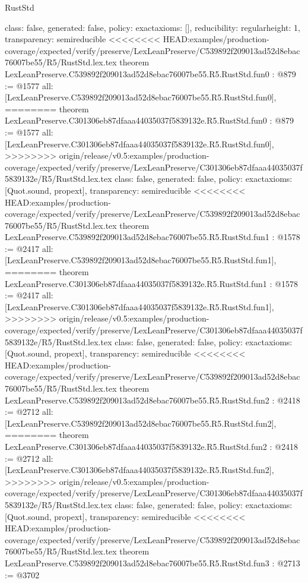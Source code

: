 \begin{lexlean}{RustStd}
\begin{coremodule}
{\begin{coremodule}
{{{  class: false,
  generated: false,
  policy: exact{axioms: []},
  reducibility: regular{height: 1},
  transparency: semireducible
}
<<<<<<<< HEAD:examples/production-coverage/expected/verify/preserve/LexLeanPreserve/C539892f209013ad52d8ebac76007be55/R5/RustStd.lex.tex
theorem LexLeanPreserve.C539892f209013ad52d8ebac76007be55.R5.RustStd.fun0 : @879 := @1577 {
  all: [LexLeanPreserve.C539892f209013ad52d8ebac76007be55.R5.RustStd.fun0],
========
theorem LexLeanPreserve.C301306eb87dfaaa44035037f5839132e.R5.RustStd.fun0 : @879 := @1577 {
  all: [LexLeanPreserve.C301306eb87dfaaa44035037f5839132e.R5.RustStd.fun0],
>>>>>>>> origin/release/v0.5:examples/production-coverage/expected/verify/preserve/LexLeanPreserve/C301306eb87dfaaa44035037f5839132e/R5/RustStd.lex.tex
  class: false,
  generated: false,
  policy: exact{axioms: [Quot.sound, propext]},
  transparency: semireducible
}
<<<<<<<< HEAD:examples/production-coverage/expected/verify/preserve/LexLeanPreserve/C539892f209013ad52d8ebac76007be55/R5/RustStd.lex.tex
theorem LexLeanPreserve.C539892f209013ad52d8ebac76007be55.R5.RustStd.fun1 : @1578 := @2417 {
  all: [LexLeanPreserve.C539892f209013ad52d8ebac76007be55.R5.RustStd.fun1],
========
theorem LexLeanPreserve.C301306eb87dfaaa44035037f5839132e.R5.RustStd.fun1 : @1578 := @2417 {
  all: [LexLeanPreserve.C301306eb87dfaaa44035037f5839132e.R5.RustStd.fun1],
>>>>>>>> origin/release/v0.5:examples/production-coverage/expected/verify/preserve/LexLeanPreserve/C301306eb87dfaaa44035037f5839132e/R5/RustStd.lex.tex
  class: false,
  generated: false,
  policy: exact{axioms: [Quot.sound, propext]},
  transparency: semireducible
}
<<<<<<<< HEAD:examples/production-coverage/expected/verify/preserve/LexLeanPreserve/C539892f209013ad52d8ebac76007be55/R5/RustStd.lex.tex
theorem LexLeanPreserve.C539892f209013ad52d8ebac76007be55.R5.RustStd.fun2 : @2418 := @2712 {
  all: [LexLeanPreserve.C539892f209013ad52d8ebac76007be55.R5.RustStd.fun2],
========
theorem LexLeanPreserve.C301306eb87dfaaa44035037f5839132e.R5.RustStd.fun2 : @2418 := @2712 {
  all: [LexLeanPreserve.C301306eb87dfaaa44035037f5839132e.R5.RustStd.fun2],
>>>>>>>> origin/release/v0.5:examples/production-coverage/expected/verify/preserve/LexLeanPreserve/C301306eb87dfaaa44035037f5839132e/R5/RustStd.lex.tex
  class: false,
  generated: false,
  policy: exact{axioms: [Quot.sound, propext]},
  transparency: semireducible
}
<<<<<<<< HEAD:examples/production-coverage/expected/verify/preserve/LexLeanPreserve/C539892f209013ad52d8ebac76007be55/R5/RustStd.lex.tex
theorem LexLeanPreserve.C539892f209013ad52d8ebac76007be55.R5.RustStd.fun3 : @2713 := @3702 {
}}}}}}
\end{coremodule}}
\end{coremodule}
\end{lexlean}
